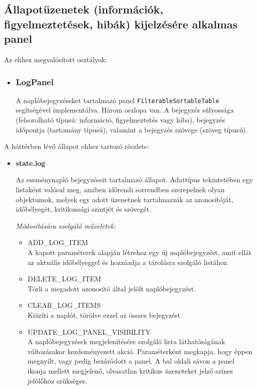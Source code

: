 \subsection{Állapotüzenetek (információk, figyelmeztetések, hibák) kijelzésére alkalmas panel}

\noindent Az ehhez megvalósított osztályok:
\begin{itemize}

\item\subsubsection{LogPanel}
A naplóbejegyzéseket tartalmazó panel \verb|FilterableSortableTable|
segítségével implementálva. Három oszlopa van. A bejegyzés súlyossága
(felsorolható típusú: információ, figyelmeztetés vagy hiba), bejegyzés időpontja
(tartomány típusú), valamint a bejegyzés szövege (szöveg típusú).

\end{itemize}
\noindent A háttérben lévő állapot ehhez tartozó részlete:
\begin{itemize}

  \item \textbf{state.log}

  Az eseménynapló bejegyzéseit tartalmazó állapot. Adattípus tekintetében egy
  listaként valósul meg, amiben időrendi sorrendben szerepelnek olyan
  objektumok, melyek egy adott üzenetnek tartalmazzák az azonosítóját,
  időbélyegét, kritikussági szintjét és szövegét.

  \textit{Módosítására szolgáló műveletek:}

  \begin{itemize}
    \item ADD\_LOG\_ITEM \\
      A kapott paraméterek alapján létrehoz egy új naplóbejegyzést, amit ellát
      az aktuális időbélyeggel és hozzáadja a tárolásra szolgáló listához.

    \item DELETE\_LOG\_ITEM \\
      Törli a megadott azonosító által jelölt naplóbejegyzést.

    \item CLEAR\_LOG\_ITEMS \\
      Kiüríti a naplót, törölve ezzel az összes bejegyzést.

    \item UPDATE\_LOG\_PANEL\_VISIBILITY \\
      A naplóbejegyzések megjelenítésére szolgáló lista láthatóságának
      változásakor kezdeményezett akció. Paraméterként megkapja, hogy éppen
      megnyílt, vagy pedig bezáródott a panel.
      A bal oldali sávon a panel ikonja mellett megjelenő, olvasatlan kritikus
      üzeneteket jelző színes jelölőhöz szükséges.

  \end{itemize}

\end{itemize}

